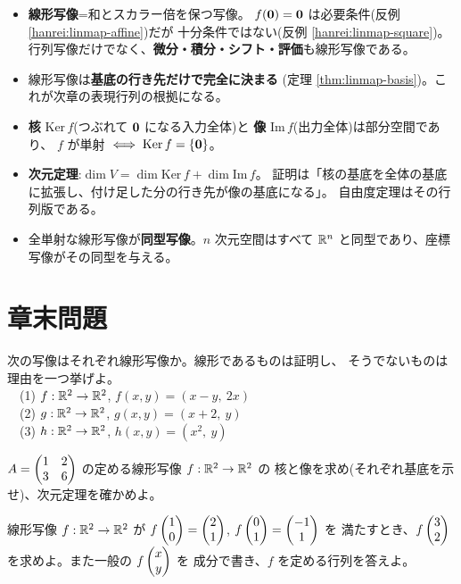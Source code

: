 \begin{matome}
\begin{itemize}
\item \textbf{線形写像}=和とスカラー倍を保つ写像。
$f(\bm{0}) = \bm{0}$ は必要条件(反例 \ref{hanrei:linmap-affine})だが
十分条件ではない(反例 \ref{hanrei:linmap-square})。
行列写像だけでなく、\textbf{微分・積分・シフト・評価}も線形写像である。
\item 線形写像は\textbf{基底の行き先だけで完全に決まる}
(定理 \ref{thm:linmap-basis})。これが次章の表現行列の根拠になる。
\item \textbf{核} $\mathrm{Ker}\,f$(つぶれて $\bm{0}$ になる入力全体)と
\textbf{像} $\mathrm{Im}\,f$(出力全体)は部分空間であり、
$f$ が単射 $\iff \mathrm{Ker}\,f = \{\bm{0}\}$。
\item \textbf{次元定理}:$\dim V = \dim \mathrm{Ker}\,f + \dim \mathrm{Im}\,f$。
証明は「核の基底を全体の基底に拡張し、付け足した分の行き先が像の基底になる」。
自由度定理はその行列版である。
\item 全単射な線形写像が\textbf{同型写像}。$n$ 次元空間はすべて
$\mathbb{R}^n$ と同型であり、座標写像がその同型を与える。
\end{itemize}
\end{matome}

\section*{章末問題}

\begin{mondai}[基本]\label{q:linmap-ex1}
次の写像はそれぞれ線形写像か。線形であるものは証明し、
そうでないものは理由を一つ挙げよ。\\
　(1) $f : \mathbb{R}^2 \to \mathbb{R}^2$, $f(x, y) = (x - y,\ 2x)$\\
　(2) $g : \mathbb{R}^2 \to \mathbb{R}^2$, $g(x, y) = (x + 2,\ y)$\\
　(3) $h : \mathbb{R}^2 \to \mathbb{R}^2$, $h(x, y) = (x^2,\ y)$
\end{mondai}

\begin{mondai}[基本]\label{q:linmap-ex2}
$A = \begin{pmatrix}1 & 2 \\ 3 & 6\end{pmatrix}$ の定める線形写像 $f : \mathbb{R}^2 \to \mathbb{R}^2$ の
核と像を求め(それぞれ基底を示せ)、次元定理を確かめよ。
\end{mondai}

\begin{mondai}[基本]\label{q:linmap-ex3}
線形写像 $f : \mathbb{R}^2 \to \mathbb{R}^2$ が
$f\begin{pmatrix}1 \\ 0\end{pmatrix} = \begin{pmatrix}2 \\ 1\end{pmatrix}$, $f\begin{pmatrix}0 \\ 1\end{pmatrix} = \begin{pmatrix}-1 \\ 1\end{pmatrix}$ を
満たすとき、$f\begin{pmatrix}3 \\ 2\end{pmatrix}$ を求めよ。また一般の $f\begin{pmatrix}x \\ y\end{pmatrix}$ を
成分で書き、$f$ を定める行列を答えよ。
\end{mondai}

